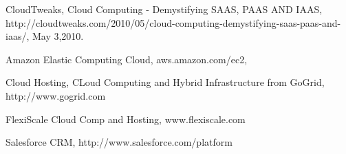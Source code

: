 \begin{thebibliography}{9}

  CloudTweaks,
  Cloud Computing - Demystifying SAAS, PAAS AND IAAS,
  http://cloudtweaks.com/2010/05/cloud-computing-demystifying-saas-paas-and-iaas/,
  May 3,2010.


  Amazon Elastic Computing Cloud, aws.amazon.com/ec2,

Cloud Hosting, CLoud Computing and Hybrid Infrastructure from GoGrid, http://www.gogrid.com

FlexiScale Cloud Comp and Hosting, www.flexiscale.com

Salesforce CRM, http://www.salesforce.com/platform




\end{thebibliography}



